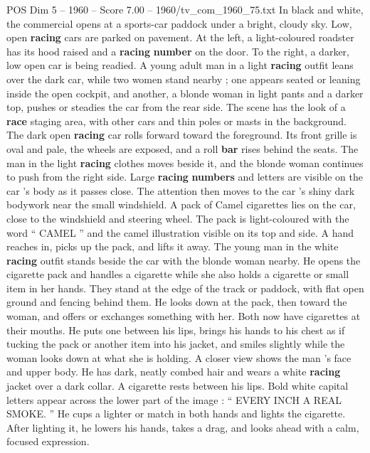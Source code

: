 \begin{textsample}{POS Dim 5 – 1960 – Score 7.00 – 1960/tv\_com\_1960\_75.txt}  \label{ex:f5_pos_051}
In black and white, the commercial opens at a sports-car paddock under a bright, cloudy sky.
Low, open \textbf{racing} cars are parked on pavement.
At the left, a light-coloured roadster has its hood raised and a \textbf{racing} \textbf{number} on the door.
To the right, a darker, low open car is being readied.
A young adult man in a light \textbf{racing} outfit leans over the dark car, while two women stand nearby ; one appears seated or leaning inside the open cockpit, and another, a blonde woman in light pants and a darker top, pushes or steadies the car from the rear side.
The scene has the look of a \textbf{race} staging area, with other cars and thin poles or masts in the background.
The dark open \textbf{racing} car rolls forward toward the foreground.
Its front grille is oval and pale, the wheels are exposed, and a roll \textbf{bar} rises behind the seats.
The man in the light \textbf{racing} clothes moves beside it, and the blonde woman continues to push from the right side.
Large \textbf{racing} \textbf{numbers} and letters are visible on the car ’s body as it passes close.
The attention then moves to the car ’s shiny dark bodywork near the small windshield.
A pack of Camel cigarettes lies on the car, close to the windshield and steering wheel.
The pack is light-coloured with the word “ CAMEL ” and the camel illustration visible on its top and side.
A hand reaches in, picks up the pack, and lifts it away.
The young man in the white \textbf{racing} outfit stands beside the car with the blonde woman nearby.
He opens the cigarette pack and handles a cigarette while she also holds a cigarette or small item in her hands.
They stand at the edge of the track or paddock, with flat open ground and fencing behind them.
He looks down at the pack, then toward the woman, and offers or exchanges something with her.
Both now have cigarettes at their mouths.
He puts one between his lips, brings his hands to his chest as if tucking the pack or another item into his jacket, and smiles slightly while the woman looks down at what she is holding.
A closer view shows the man ’s face and upper body.
He has dark, neatly combed hair and wears a white \textbf{racing} jacket over a dark collar.
A cigarette rests between his lips.
Bold white capital letters appear across the lower part of the image : “ EVERY INCH A REAL SMOKE. ” He cups a lighter or match in both hands and lights the cigarette.
After lighting it, he lowers his hands, takes a drag, and looks ahead with a calm, focused expression.

\end{textsample}
